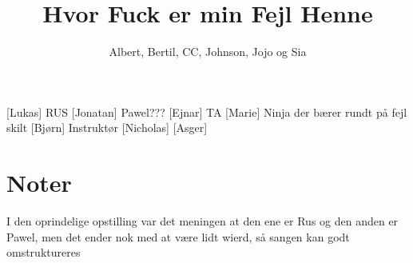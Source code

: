 \documentclass[a4paper,11pt]{article}
\title{Hvor Fuck er min Fejl Henne}
\author{Albert, Bertil, CC, Johnson, Jojo og Sia}
\begin{document}
\maketitle

\begin{roles}
[Lukas] RUS
[Jonatan] Pawel???
[Ejnar] TA
[Marie] Ninja der bærer rundt på fejl skilt
[Bjørn] Instruktør
[Nicholas]
[Asger]
\end{roles} 

\section*{Noter}
I den oprindelige opstilling var det meningen at den ene er Rus og den anden er Pawel, men det ender nok med at være lidt wierd, så sangen kan godt omstruktureres
\begin{props}
\prop{}
\prop{}
\prop{}
\prop{}
\prop{}
\prop{}
\end{props}


    
\end{document}
